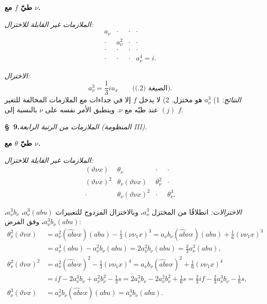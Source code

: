 \documentclass[11pt]{article}
\begin{document}
\noindent\textbf{طيّ $f$ مع $\nu$.}

\noindent\emph{الملازمات غير القابلة للاختزال:}
\[
\begin{array}{cccc}
a_\nu&\cdot&\cdot&\cdot\\
\cdot&a_\nu^2&\cdot&\cdot\\
\cdot&\cdot&\cdot&\cdot\\
\cdot&\cdot&\cdot&a_\nu^4=i.
\end{array}
\]

\noindent\emph{الاختزال:}
\[
a_\nu^3=\frac13iu_x\qquad\text{(الصيغة (2.)).}
\]
\noindent\emph{النتائج:} 1) $a_\nu^3$ هو مختزل. 2) لا يدخل $f$ إلا في جداءات مع الملازمات المخالفة للتغير $(j)$ عند طيّه مع $\nu$. وينطبق الأمر نفسه على $\nu$ بالنسبة إلى $f$.

\begin{center}
\textbf{\S\ 9.}\quad\emph{الملازمات من الرتبة الرابعة (المنظومة III).}
\end{center}

\noindent\textbf{طيّ $\theta$ مع $\nu$.}

\noindent\emph{الملازمات غير القابلة للاختزال:}
\[
\begin{array}{cccc}
(\vartheta\nu x)&\theta_\nu&\cdot&\cdot\\
(\vartheta\nu x)^2&\theta_\nu(\vartheta\nu x)&\theta_\nu^2&\cdot\\
\cdot&\theta_\nu(\vartheta\nu x)^2&\cdot&\theta_\nu^3.
\end{array}
\]

\noindent\emph{الاختزالات:} انطلاقًا من المختزل $a_\nu^3$، وبالاختزال المزدوج للتعبيرات
$a_\nu^3(abu)$، $a_\nu^3b_\nu$، $a_\nu^3b_\nu(abu)$، وفق الفرض:
\[
\begin{aligned}
\theta_\nu^2(\vartheta\nu x)
&=a_\nu^2(\widehat{ab}\nu x)(abu)-\frac13(\nu\nu_1x)^3
=a_\nu b_\nu(\widehat{ab}\nu x)(abu)+\frac16(\nu\nu_1x)^3\\
&=a_\nu^3(abu)-a_\nu^2b_\nu(abu)=2a_\nu^2b_\nu(abu)=\frac23a_\nu^3(abu),\\[.4em]
\theta_\nu^2(\vartheta\nu x)^2
&=a_\nu^2(\widehat{ab}\nu x)^2-\frac13(\nu\nu_1x)^4
=a_\nu b_\nu(\widehat{ab}\nu x)^2+\frac16(\nu\nu_1x)^4\\
&=i f-2a_\nu^3b_\nu+a_\nu^2b_\nu^2-\frac13s
=2a_\nu^3b_\nu-2a_\nu^2b_\nu^2+\frac16s
=\frac23i f-\frac23a_\nu^3b_\nu-\frac16s,\\[.4em]
\theta_\nu^3(\vartheta\nu x)&=a_\nu^2b_\nu(\widehat{ab}\nu x)(abu)=a_\nu^3b_\nu(abu).
\end{aligned}
\]
\end{document}
